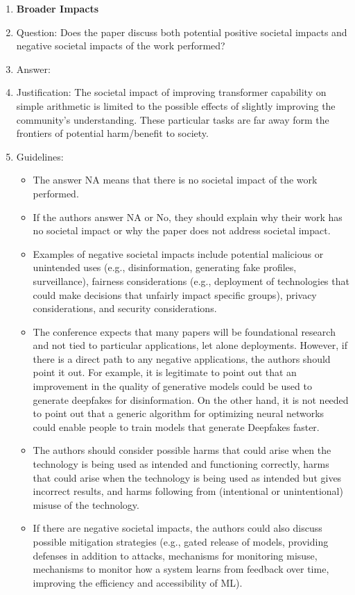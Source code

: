 \documentclass{article}
\begin{document}
\begin{enumerate}
\item {\bf Broader Impacts}
    \item[] Question: Does the paper discuss both potential positive societal impacts and negative societal impacts of the work performed?
    \item[] Answer: \answerNA{} %
    \item[] Justification: The societal impact of improving transformer capability on simple arithmetic is limited to the possible effects of slightly improving the community's understanding. These particular tasks are far away form the frontiers of potential harm/benefit to society.
    \item[] Guidelines:
    \begin{itemize}
        \item The answer NA means that there is no societal impact of the work performed.
        \item If the authors answer NA or No, they should explain why their work has no societal impact or why the paper does not address societal impact.
        \item Examples of negative societal impacts include potential malicious or unintended uses (e.g., disinformation, generating fake profiles, surveillance), fairness considerations (e.g., deployment of technologies that could make decisions that unfairly impact specific groups), privacy considerations, and security considerations.
        \item The conference expects that many papers will be foundational research and not tied to particular applications, let alone deployments. However, if there is a direct path to any negative applications, the authors should point it out. For example, it is legitimate to point out that an improvement in the quality of generative models could be used to generate deepfakes for disinformation. On the other hand, it is not needed to point out that a generic algorithm for optimizing neural networks could enable people to train models that generate Deepfakes faster.
        \item The authors should consider possible harms that could arise when the technology is being used as intended and functioning correctly, harms that could arise when the technology is being used as intended but gives incorrect results, and harms following from (intentional or unintentional) misuse of the technology.
        \item If there are negative societal impacts, the authors could also discuss possible mitigation strategies (e.g., gated release of models, providing defenses in addition to attacks, mechanisms for monitoring misuse, mechanisms to monitor how a system learns from feedback over time, improving the efficiency and accessibility of ML).
    \end{itemize}
    

\end{enumerate}
\end{document}
